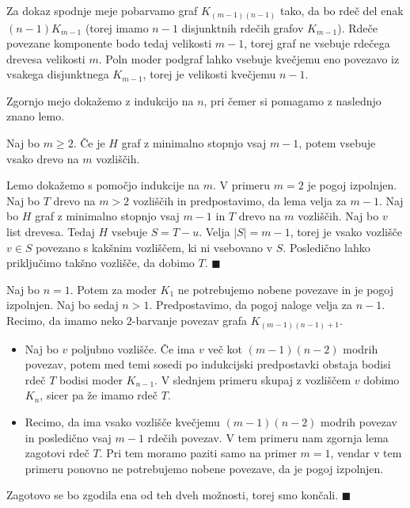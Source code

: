 \documentclass[twoside,11pt]{article}
\providecommand{\abs}[1]{\left\lvert #1\right\rvert}
\begin{document}
\begin{dokaz}
    Za dokaz spodnje meje pobarvamo graf $K_{(m-1)(n-1)}$ tako, da bo rdeč del enak 
    $(n-1)K_{m-1}$ (torej imamo $n-1$ disjunktnih rdečih grafov $K_{m-1}$). Rdeče povezane komponente 
    bodo tedaj velikosti $m-1$, torej graf ne vsebuje rdečega drevesa velikosti $m$. Poln moder 
    podgraf lahko vsebuje kvečjemu eno povezavo iz vsakega disjunktnega $K_{m-1}$, torej je 
    velikosti kvečjemu $n-1$.

    Zgornjo mejo dokažemo z indukcijo na $n$, pri čemer si pomagamo z naslednjo znano lemo.
    \begin{lema*}
        Naj bo $m \ge 2$. Če je $H$ graf z minimalno stopnjo vsaj $m-1$, potem vsebuje vsako drevo na $m$ vozliščih.
    \end{lema*}
    \begin{dokaz}
        Lemo dokažemo s pomočjo indukcije na $m$. V primeru $m=2$ je pogoj izpolnjen. Naj bo 
        $T$ drevo na $m > 2$ vozliščih in predpostavimo, da lema velja za $m-1$. Naj bo $H$ 
        graf z minimalno stopnjo vsaj $m-1$ in $T$ drevo na $m$ vozliščih. Naj bo $v$ list drevesa. 
        Tedaj $H$ vsebuje $S = T - u$. Velja $\abs{S} = {m-1}$, torej je vsako vozlišče 
        $v \in S$ povezano s kakšnim vozliščem, ki ni vsebovano v $S$. Posledično lahko 
        priključimo takšno vozlišče, da dobimo $T$. \hfill $\blacksquare$
    \end{dokaz}
    Naj bo $n = 1$. Potem za moder $K_1$ ne potrebujemo nobene povezave in je pogoj izpolnjen. 
    Naj bo sedaj $n > 1$. Predpostavimo, da pogoj naloge velja za $n - 1$. Recimo, da imamo neko $2$-barvanje povezav grafa $K_{(m-1)(n-1)+1}$. 
    \begin{itemize}
        \item Naj bo $v$ poljubno vozlišče. Če ima $v$ več kot $(m-1)(n-2)$ modrih povezav, potem med temi sosedi 
        po indukcijski predpostavki obstaja bodisi rdeč $T$ bodisi moder $K_{n-1}$. V slednjem 
        primeru skupaj z vozliščem $v$ dobimo $K_n$, sicer pa že imamo rdeč $T$.
        \item Recimo, da ima vsako vozlišče kvečjemu $(m-1)(n-2)$ modrih povezav in posledično 
        vsaj $m-1$ rdečih povezav. V tem primeru nam zgornja lema zagotovi rdeč $T$. Pri tem 
        moramo paziti samo na primer $m = 1$, vendar v tem primeru ponovno ne potrebujemo 
        nobene povezave, da je pogoj izpolnjen.
    \end{itemize}
    Zagotovo se bo zgodila ena od teh dveh možnosti, torej smo končali.  \hfill $\blacksquare$
\end{dokaz}
\end{document}
